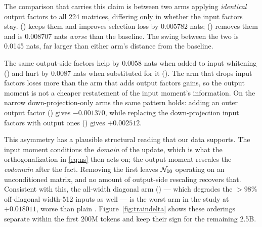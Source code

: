 The comparison that carries this claim is between two arms applying
\emph{identical} output factors to all 224 matrices, differing only in whether
the input factors stay.  (\dense{}) keeps them and improves
selection loss by $0.005782$ nats;  (\leftall{}) removes them
and is $0.008707$ nats \emph{worse} than the baseline. The swing between the two
is 0.0145 nats, far larger than either arm's distance from the baseline.

\begin{finding}
The same output-side factors help by $0.0058$ nats when added to input
whitening () and hurt by $0.0087$ nats when substituted for it
(). The arm that drops input factors loses more than the arm
that adds output factors gains, so the output moment is not a cheaper
restatement of the input moment's information. On the narrow
down-projection-only arms the same pattern holds: adding an outer output factor
() gives $-0.001370$, while replacing the down-projection
input factors with output ones () gives $+0.002512$.
\end{finding}

This asymmetry has a plausible structural reading that our data supports. The
input moment conditions the \emph{domain} of the update, which is what the
orthogonalization in \eqref{eq:ns} then acts on; the output moment rescales the
\emph{codomain} after the fact. Removing the first leaves $\mathcal{N}_{10}$ operating on
an unconditioned matrix, and no amount of output-side rescaling recovers that.
Consistent with this, the all-width diagonal arm 
(\bothdiag{}) --- which degrades the $>98\%$ off-diagonal width-512 inputs as
well --- is the worst arm in the study at $+0.018011$, worse than plain
. Figure~\ref{fig:traindelta} shows these orderings separate within
the first 200M tokens and keep their sign for the remaining 2.5B.

